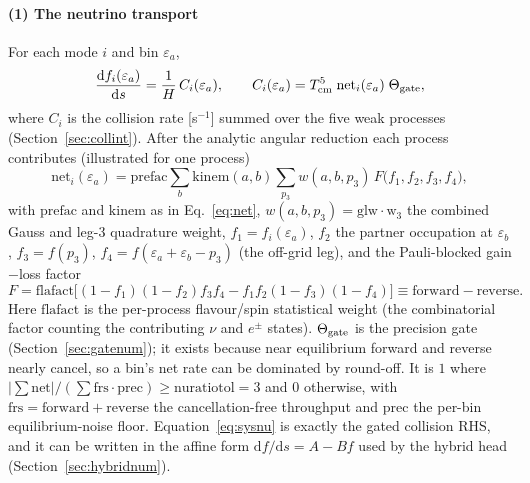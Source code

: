 \documentclass[11pt]{article}
\newcommand{\Tcm}{T_{\mathrm{cm}}}
\newcommand{\eps}{\varepsilon}
\newcommand{\dd}{\mathrm{d}}
\begin{document}
\paragraph{(1) The neutrino transport}
For each mode $i$ and bin $\eps_a$,
\begin{equation}
  \frac{\dd f_i(\eps_a)}{\dd s}=\frac{1}{H}\,C_i(\eps_a),
  \qquad
  C_i(\eps_a)=\Tcm^5\;\mathrm{net}_i(\eps_a)\;\Theta_{\rm gate},
  \label{eq:sysnu}
\end{equation}
where $C_i$ is the collision rate [s$^{-1}$] summed over the five weak processes
(Section~\ref{sec:collint}).  After the analytic angular reduction each process
contributes (illustrated for one process)
\begin{equation}
  \mathrm{net}_i(\eps_a)=\mathrm{prefac}\sum_b\mathrm{kinem}(a,b)
  \sum_{p_3}w(a,b,p_3)\,F\!\big(f_1,f_2,f_3,f_4\big),
  \label{eq:sysnet}
\end{equation}
with $\mathrm{prefac}$ and $\mathrm{kinem}$ as in Eq.~\eqref{eq:net},
$w(a,b,p_3)=\mathrm{glw}\cdot\mathrm{w_3}$ the combined Gauss and leg-3 quadrature weight,
$f_1=f_i(\eps_a)$, $f_2$ the partner occupation at $\eps_b$, $f_3=f(p_3)$,
$f_4=f(\eps_a{+}\eps_b{-}p_3)$ (the off-grid leg), and the Pauli-blocked
gain$-$loss factor
\begin{equation}
  F=\mathrm{flafact}\Big[(1{-}f_1)(1{-}f_2)f_3 f_4-f_1 f_2(1{-}f_3)(1{-}f_4)\Big]
  \equiv\mathrm{forward}-\mathrm{reverse}.
  \label{eq:sysF}
\end{equation}
Here $\mathrm{flafact}$ is the per-process flavour/spin statistical weight (the
combinatorial factor counting the contributing $\nu$ and $e^\pm$ states).
$\Theta_{\rm gate}$ is the precision gate (Section~\ref{sec:gatenum}); it exists
because near equilibrium forward and reverse nearly cancel, so a bin's net rate
can be dominated by round-off.  It is $1$ where
$|\sum\mathrm{net}|/(\sum\mathrm{frs}\cdot\mathrm{prec})\ge\mathrm{nuratiotol}=3$
and $0$ otherwise, with $\mathrm{frs}=\mathrm{forward}+\mathrm{reverse}$ the
cancellation-free throughput and $\mathrm{prec}$ the per-bin equilibrium-noise
floor.  Equation~\eqref{eq:sysnu} is exactly the gated collision RHS, and it can
be written in the affine form $\dd f/\dd s=A-Bf$ used by the hybrid head
(Section~\ref{sec:hybridnum}).
\end{document}
